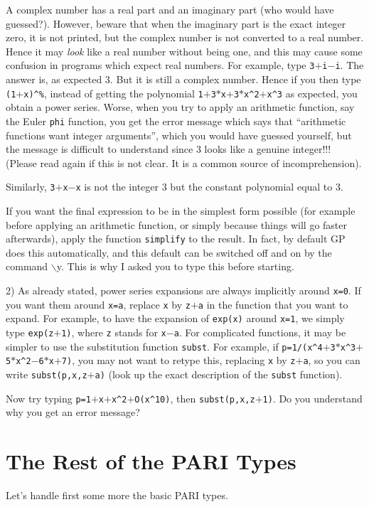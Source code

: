 A complex number has a real part and an imaginary part (who would have guessed?).
However, beware that when the imaginary part is the exact integer zero, it is not printed,
but the complex number is not converted to a real number. Hence it may {\sl look\/} like
a real number without being one, and this may cause some confusion in programs which expect
real numbers. For example, type {\tt 3$+$i$-$i}. The answer is, as expected 3. But it is still
a complex number. Hence if you then type {\tt (1$+$x)\^{}\%}, instead of getting the polynomial
{\tt 1$+$3$*$x$+$3$*$x\^{}2$+$x\^{}3} as expected, you obtain a power series. Worse, when you try to
apply an arithmetic function, say the Euler {\tt phi} function, you get the error message
which says that ``arithmetic functions want integer arguments'', which you would have
guessed yourself, but the message is difficult to understand since 3 looks like a genuine
integer!!! (Please read again if this is not clear. It is a common source of incomprehension).

Similarly, {\tt 3$+$x$-$x} is not the integer 3 but the constant polynomial equal
to 3.

If you want the final expression to be in the simplest form possible (for
example before applying an arithmetic function, or simply because things
will go faster afterwards), apply the function {\tt simplify} to the 
result. In fact, by default GP does this automatically, and this default
can be switched off and on by the command $\backslash$y. This is why I asked
you to type this before starting.

2) As already stated, power series expansions are always implicitly around {\tt x=0}. If you
want them around {\tt x=a}, replace {\tt x} by {\tt z$+$a} in the function that you want to
expand. For example, to have the expansion of {\tt exp(x)} around {\tt x=1}, we simply type
{\tt exp(z$+$1)}, where {\tt z} stands for {\tt x$-$a}. For complicated functions, it may be
simpler to use the substitution function {\tt subst}. For example, if 
{\tt p=1/(x\^{}4$+$3$*$x\^{}3$+$5$*$x\^{}2$-$6$*$x$+$7)}, you may not want to retype this, replacing {\tt x} by {\tt z$+$a},
so you can write {\tt subst(p,x,z$+$a)} (look up the exact description of the {\tt subst} function).

Now try typing {\tt p=1$+$x$+$x\^{}2$+$O(x\^{}10)}, then {\tt subst(p,x,z$+$1)}. Do you 
understand why you get an error message?
\medskip
\section{The Rest of the PARI Types}
\medskip
Let's handle first some more the basic PARI types.

